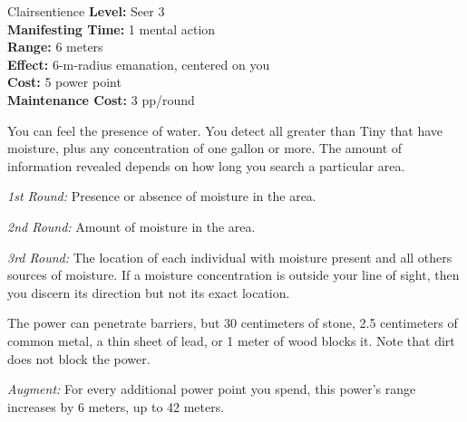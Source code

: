 {Clairsentience}
{
	\textbf{Level:}
	Seer 3\\
	\textbf{Manifesting Time:}
	1 mental action\\
	\textbf{Range:}
	6 meters\\
	\textbf{Effect:}
	6-m-radius emanation, centered on you\\
	\textbf{Cost:}
	5 power point\\
	\textbf{Maintenance Cost:}
	3 pp/round\\
}
{
	You can feel the presence of water. You detect all greater than Tiny that have moisture, plus any concentration of one gallon or more. The amount of information revealed depends on how long you search a particular area.

	\textit{1st Round:} Presence or absence of moisture in the area.

	\textit{2nd Round:} Amount of moisture in the area.

	\textit{3rd Round:} The location of each individual with moisture present and all others sources of moisture. If a moisture concentration is outside your line of sight, then you discern its direction but not its exact location.

	The power can penetrate barriers, but 30 centimeters of stone, 2.5 centimeters of common metal, a thin sheet of lead, or 1 meter of wood blocks it. Note that dirt does not block the power.

	\textit{Augment:} For every additional power point you spend, this power's range increases by 6 meters, up to 42 meters.
}